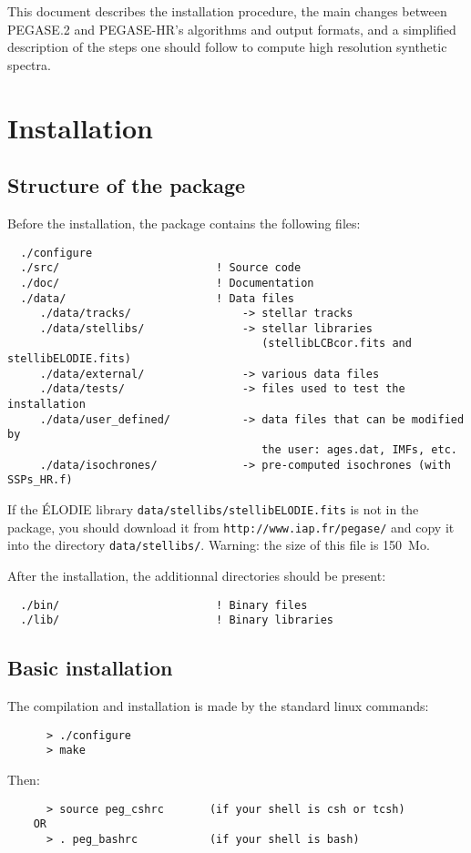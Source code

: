 \documentclass[11pt,fleqn]{article}
\begin{document}
This document describes the installation procedure, the main changes
between PEGASE.2 and PEGASE-HR's algorithms and output formats, and a
simplified description of the steps one should follow to compute high
resolution synthetic spectra.
\section{Installation}
\subsection{Structure of the package}
Before the installation, the package contains the following files:
\begin{verbatim}
  ./configure
  ./src/                        ! Source code
  ./doc/                        ! Documentation
  ./data/                       ! Data files
     ./data/tracks/                 -> stellar tracks
     ./data/stellibs/               -> stellar libraries
                                       (stellibLCBcor.fits and stellibELODIE.fits)
     ./data/external/               -> various data files
     ./data/tests/                  -> files used to test the installation
     ./data/user_defined/           -> data files that can be modified by 
                                       the user: ages.dat, IMFs, etc.
     ./data/isochrones/             -> pre-computed isochrones (with SSPs_HR.f)

\end{verbatim}

If the \'ELODIE library \texttt{data/stellibs/stellibELODIE.fits} is not
in the package, you should download it from
\texttt{http://www.iap.fr/pegase/} and copy it into the directory
\texttt{data/stellibs/}. Warning: the size of this file is 150~Mo.

After the installation, the additionnal directories should be present:
\begin{verbatim}
  ./bin/                        ! Binary files
  ./lib/                        ! Binary libraries
\end{verbatim}
\subsection{Basic installation}
The compilation and installation is made by the standard linux commands:
\begin{verbatim}
      > ./configure
      > make
\end{verbatim}
Then:
\begin{verbatim}
      > source peg_cshrc       (if your shell is csh or tcsh)
    OR
      > . peg_bashrc           (if your shell is bash)
\end{verbatim}
\end{document}
